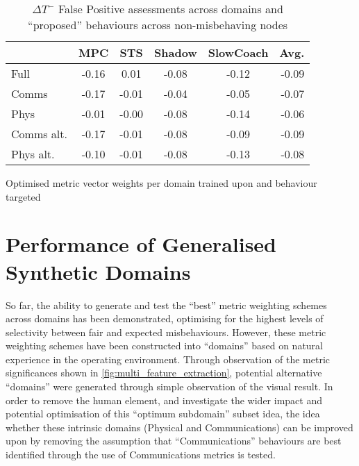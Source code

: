 \begin{table}
	\centering
	\caption{$\Delta T^-$ False Positive assessments across domains and ``proposed'' behaviours across non-misbehaving nodes}
	\begin{tabular}{|l|*{4}{c}|r|}
		\toprule
		\diagbox{Domain}{Behaviour} &   MPC &   STS &  Shadow &  SlowCoach &  Avg. \\
		\midrule
		Full       & -0.16 &  0.01 &   -0.08 &      -0.12 & -0.09 \\
		Comms      & -0.17 & -0.01 &   -0.04 &      -0.05 & -0.07 \\
		Phys       & -0.01 & -0.00 &   -0.08 &      -0.14 & -0.06 \\
		Comms alt. & -0.17 & -0.01 &   -0.08 &      -0.09 & -0.09 \\
		Phys alt.  & -0.10 & -0.01 &   -0.08 &      -0.13 & -0.08 \\
		\bottomrule
	\end{tabular}
	
	\label{tab:domain_deltas_minus}
\end{table}

\begin{landscape}
  \begin{table}
    \centering
    \caption{Optimised metric vector weights per domain trained upon and behaviour targeted}
    
    \label{tab:optimised_weights}
  \end{table}
\end{landscape}

\section{Performance of Generalised Synthetic Domains}\label{sec:mdt_synthetic}
So far, the ability to generate and test the ``best'' metric weighting schemes across domains has been demonstrated, optimising for the highest levels of selectivity between fair and expected misbehaviours. 
However, these metric weighting schemes have been constructed into ``domains'' based on natural experience in the operating environment. 
Through observation of the metric significances shown in \autoref{fig:multi_feature_extraction}, potential alternative ``domains'' were generated through simple observation of the visual result.
In order to remove the human element, and investigate the wider impact and potential optimisation of this ``optimum subdomain'' subset idea, the idea whether these intrinsic  domains (Physical and Communications) can be improved upon by removing the assumption that ``Communications'' behaviours are best identified through the use of Communications metrics is tested.

